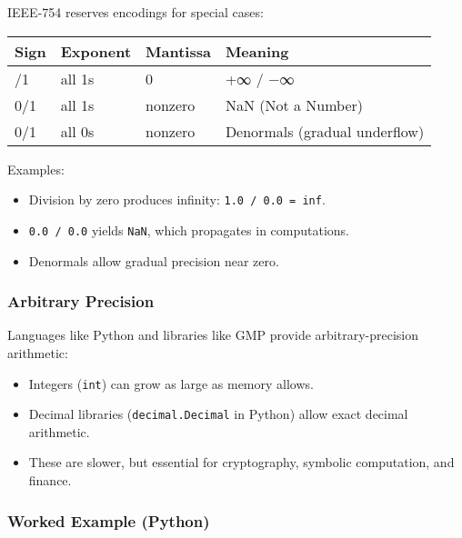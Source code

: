 \documentclass[
  letterpaper,
  DIV=11,
  numbers=noendperiod]{scrreprt}
\providecommand{\tightlist}{%
  \setlength{\itemsep}{0pt}\setlength{\parskip}{0pt}}
\begin{document}
IEEE-754 reserves encodings for special cases:

\begin{longtable}[]{@{}llll@{}}
\toprule\noalign{}
Sign & Exponent & Mantissa & Meaning \\
\midrule\noalign{}
\endhead
\bottomrule\noalign{}
\endlastfoot
0/1 & all 1s & 0 & +∞ / −∞ \\
0/1 & all 1s & nonzero & NaN (Not a Number) \\
0/1 & all 0s & nonzero & Denormals (gradual underflow) \\
\end{longtable}

Examples:

\begin{itemize}
\tightlist
\item
  Division by zero produces infinity: \texttt{1.0\ /\ 0.0\ =\ inf}.
\item
  \texttt{0.0\ /\ 0.0} yields \texttt{NaN}, which propagates in
  computations.
\item
  Denormals allow gradual precision near zero.
\end{itemize}

\subsubsection{Arbitrary Precision}\label{arbitrary-precision}

Languages like Python and libraries like GMP provide arbitrary-precision
arithmetic:

\begin{itemize}
\tightlist
\item
  Integers (\texttt{int}) can grow as large as memory allows.
\item
  Decimal libraries (\texttt{decimal.Decimal} in Python) allow exact
  decimal arithmetic.
\item
  These are slower, but essential for cryptography, symbolic
  computation, and finance.
\end{itemize}

\subsubsection{Worked Example (Python)}\label{worked-example-python-1}
\end{document}
